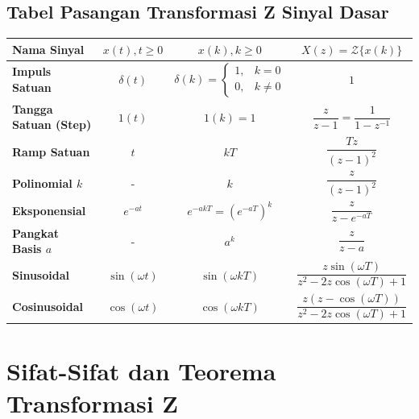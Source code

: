 \documentclass[11pt,a4paper]{article}
\begin{document}
\subsection{Tabel Pasangan Transformasi Z Sinyal Dasar}
\begin{center}
\small
\begin{tabular}{|l|c|c|c|}
\hline
\textbf{Nama Sinyal} & $x(t), t \ge 0$ & $x(k), k \ge 0$ & $X(z) = \mathcal{Z}\{x(k)\}$ \\ \hline
\textbf{Impuls Satuan} & $\delta(t)$ & $\delta(k) = \begin{cases} 1, & k=0 \\ 0, & k \ne 0 \end{cases}$ & $1$ \\ \hline
\textbf{Tangga Satuan (Step)} & $1(t)$ & $1(k) = 1$ & $\dfrac{z}{z-1} = \dfrac{1}{1-z^{-1}}$ \\ \hline
\textbf{Ramp Satuan} & $t$ & $kT$ & $\dfrac{T z}{(z-1)^2}$ \\ \hline
\textbf{Polinomial $k$} & - & $k$ & $\dfrac{z}{(z-1)^2}$ \\ \hline
\textbf{Eksponensial} & $e^{-at}$ & $e^{-akT} = (e^{-aT})^k$ & $\dfrac{z}{z - e^{-aT}}$ \\ \hline
\textbf{Pangkat Basis $a$} & - & $a^k$ & $\dfrac{z}{z-a}$ \\ \hline
\textbf{Sinusoidal} & $\sin(\omega t)$ & $\sin(\omega k T)$ & $\dfrac{z \sin(\omega T)}{z^2 - 2z \cos(\omega T) + 1}$ \\ \hline
\textbf{Cosinusoidal} & $\cos(\omega t)$ & $\cos(\omega k T)$ & $\dfrac{z (z - \cos(\omega T))}{z^2 - 2z \cos(\omega T) + 1}$ \\ \hline
\end{tabular}
\end{center}

\vspace{6pt}

\section{Sifat-Sifat dan Teorema Transformasi Z}
\end{document}
